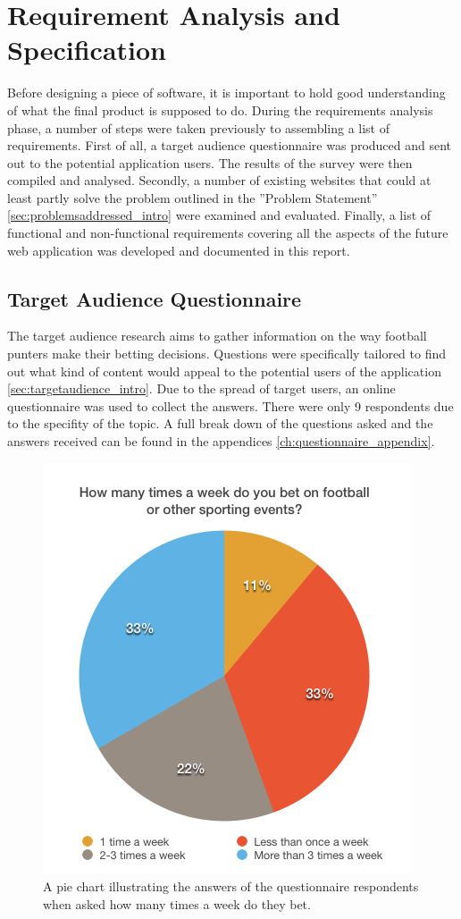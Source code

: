 \chapter{Requirement Analysis and Specification}
\label{ch:requirementanalysis}
Before designing a piece of software, it is important to hold good understanding of what the final product is supposed to do. During the requirements analysis phase, a number of steps were taken previously to assembling a list of requirements. First of all, a target audience questionnaire was produced and sent out to the potential application users. The results of the survey were then compiled and analysed. Secondly, a number of existing websites that could at least partly solve the problem outlined in the ”Problem Statement” \ref{sec:problemsaddressed_intro}  were examined and evaluated. Finally, a list of functional and non-functional requirements covering all the aspects of the future web application was developed and documented in this report.

\section{Target Audience Questionnaire}
\label{sec:targetaudiencequestionnaire_req}
The target audience research aims to gather information on the way football punters make their betting decisions. Questions were specifically tailored to find out what kind of content would appeal to the potential users of the application \ref{sec:targetaudience_intro}. Due to the spread of target users, an online questionnaire was used to collect the answers. There were only 9 respondents due to the specifity of the topic. A full break down of the questions asked and the answers received can be found in the appendices \ref{ch:questionnaire_appendix}.

\begin{figure}[H]
	\begin{center}
		\includegraphics[width=.50\columnwidth]{req/images/howMuchDoYouBet.png}
		\caption{A pie chart illustrating the answers of the questionnaire respondents when asked how many times a week do they bet.} \label{fig:using:howmuchdoyoubet}
	\end{center}
\end{figure}

